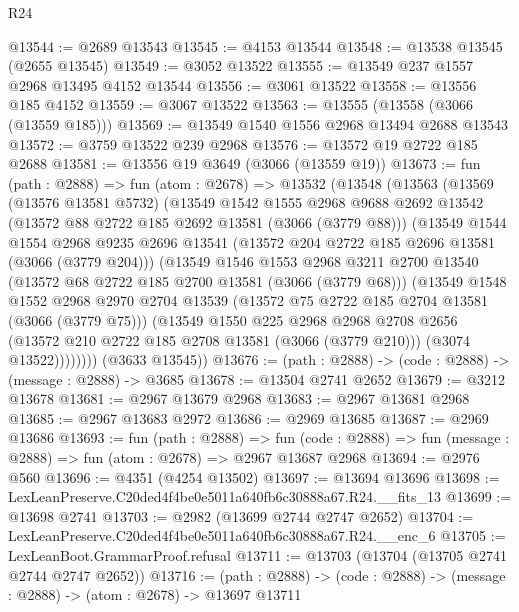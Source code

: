 \begin{lexlean}{R24}
\begin{coremodule}
@13544 := @2689 @13543
@13545 := @4153 @13544
@13548 := @13538 @13545 (@2655 @13545)
@13549 := @3052 @13522
@13555 := @13549 @237 @1557 @2968 @13495 @4152 @13544
@13556 := @3061 @13522
@13558 := @13556 @185 @4152
@13559 := @3067 @13522
@13563 := @13555 (@13558 (@3066 (@13559 @185)))
@13569 := @13549 @1540 @1556 @2968 @13494 @2688 @13543
@13572 := @3759 @13522 @239 @2968
@13576 := @13572 @19 @2722 @185 @2688
@13581 := @13556 @19 @3649 (@3066 (@13559 @19))
@13673 := fun (path : @2888) =>
  fun (atom : @2678) =>
  @13532
    (@13548
      (@13563
        (@13569
          (@13576 @13581 @5732)
          (@13549
            @1542
            @1555
            @2968
            @9688
            @2692
            @13542
            (@13572 @88 @2722 @185 @2692 @13581 (@3066 (@3779 @88)))
            (@13549
              @1544
              @1554
              @2968
              @9235
              @2696
              @13541
              (@13572 @204 @2722 @185 @2696 @13581 (@3066 (@3779 @204)))
              (@13549
                @1546
                @1553
                @2968
                @3211
                @2700
                @13540
                (@13572 @68 @2722 @185 @2700 @13581 (@3066 (@3779 @68)))
                (@13549
                  @1548
                  @1552
                  @2968
                  @2970
                  @2704
                  @13539
                  (@13572 @75 @2722 @185 @2704 @13581 (@3066 (@3779 @75)))
                  (@13549
                    @1550
                    @225
                    @2968
                    @2968
                    @2708
                    @2656
                    (@13572 @210 @2722 @185 @2708 @13581 (@3066 (@3779 @210)))
                    (@3074 @13522))))))))
      (@3633 @13545))
@13676 := (path : @2888) -> (code : @2888) -> (message : @2888) -> @3685
@13678 := @13504 @2741 @2652
@13679 := @3212 @13678
@13681 := @2967 @13679 @2968
@13683 := @2967 @13681 @2968
@13685 := @2967 @13683 @2972
@13686 := @2969 @13685
@13687 := @2969 @13686
@13693 := fun (path : @2888) =>
  fun (code : @2888) => fun (message : @2888) => fun (atom : @2678) => @2967 @13687 @2968
@13694 := @2976 @560
@13696 := @4351 (@4254 @13502)
@13697 := @13694 @13696
@13698 := LexLeanPreserve.C20ded4f4be0e5011a640fb6c30888a67.R24.__fits_13
@13699 := @13698 @2741
@13703 := @2982 (@13699 @2744 @2747 @2652)
@13704 := LexLeanPreserve.C20ded4f4be0e5011a640fb6c30888a67.R24.__enc_6
@13705 := LexLeanBoot.GrammarProof.refusal
@13711 := @13703 (@13704 (@13705 @2741 @2744 @2747 @2652))
@13716 := (path : @2888) -> (code : @2888) -> (message : @2888) -> (atom : @2678) -> @13697 @13711

\end{coremodule}
\end{lexlean}
